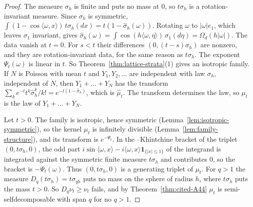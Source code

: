 \begin{proof}
\leanok
{}
The measure $\sigma_h$ is finite and puts no mass at $0$, so $t\sigma_h$ is a rotation-invariant
\Levy{} measure. Since $\sigma_h$ is symmetric,
$\int(1 - \cos\langle\omega, x\rangle)\,t\sigma_h(dx) = t(1 - \widehat\sigma_h(\omega))$. Rotating
$\omega$ to $|\omega|e_1$, which leaves $\sigma_1$ invariant, gives
$\widehat\sigma_h(\omega) = \int\cos(h\langle\omega, \eta\rangle)\,\sigma_1(d\eta) = \Omega_d(h|\omega|)$.
The data vanish at $t = 0$. For $s < t$ their differences $(0, (t - s)\sigma_h)$ are nonzero, and
they are rotation-invariant \Levy{} data, for the same reason as $t\sigma_h$. The exponent
$\Psi_t(\omega)$ is linear in $t$. So Theorem~\ref{thm:lattice-strata}(1) gives an isotropic family.
If $N$ is Poisson with mean $t$ and $Y_1, Y_2, \dots$ are independent with law $\sigma_h$, independent
of $N$, then $Y_1 + \dots + Y_N$ has the transform
$\sum_ke^{-t}t^k\widehat\sigma_h^k/k! = e^{-t(1 - \widehat\sigma_h)}$, which is $\widehat\mu_t$. The
transform determines the law, so $\mu_t$ is the law of $Y_1 + \dots + Y_N$.

Let $t > 0$. The family is isotropic, hence symmetric (Lemma~\ref{lem:isotropic-symmetric}), so
the kernel $\mu_t$ is infinitely divisible (Lemma~\ref{lem:family-structure}), and its transform is
$e^{-\Psi_t}$. In the \Levy--Khintchine bracket of the triplet $(0, t\sigma_h, 0)$, the odd part $i\sin\langle\omega, x\rangle - i\langle\omega, x\rangle
\mathbf 1_{\{|x| \le 1\}}$ of the integrand is integrated against the symmetric finite measure
$t\sigma_h$ and contributes $0$, so the bracket is $-\Psi_t(\omega)$. Thus $(0, t\sigma_h, 0)$ is a
generating triplet of $\mu_t$. For $q > 1$ the measure $D_q(t\sigma_h) = t\sigma_{qh}$ puts no mass on
the sphere of radius $h$, where $t\sigma_h$ puts the mass $t > 0$. So $D_q\nu_t \ge \nu_t$ fails,
and by Theorem~\ref{thm:cited-A44} $\mu_t$ is semi-selfdecomposable with span $q$ for no $q > 1$.


\end{proof}
